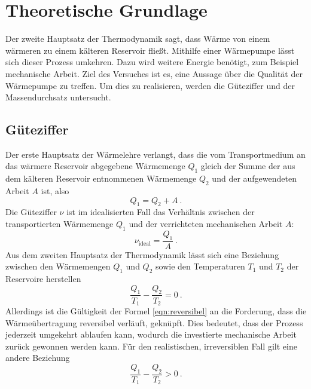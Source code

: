 \section{Theoretische Grundlage}
\label{sec:Theorie}

Der zweite Hauptsatz der Thermodynamik sagt, dass Wärme von einem wärmeren zu einem kälteren Reservoir fließt. Mithilfe einer Wärmepumpe lässt sich dieser Prozess umkehren. Dazu wird weitere Energie benötigt, zum Beispiel mechanische Arbeit. Ziel des Versuches ist es, eine Aussage über die Qualität der Wärmepumpe zu treffen. Um dies zu realisieren, werden die Güteziffer und der Massendurchsatz untersucht.

\subsection{Güteziffer}
Der erste Hauptsatz der Wärmelehre verlangt, dass die vom Transportmedium an das wärmere Reservoir abgegebene Wärmemenge $Q_\text{1}$ gleich der Summe der aus dem kälteren Reservoir entnommenen Wärmemenge $Q_\text{2}$ und der aufgewendeten Arbeit $A$ ist, also
\begin{equation}
	\label{eqn:Q1}
		Q_\text{1} = Q_\text{2} + A \ .
\end{equation}
Die Güteziffer $\nu$ ist im idealisierten Fall das Verhältnis zwischen der transportierten Wärmemenge $Q_\text{1}$ und der verrichteten mechanischen Arbeit $A$:
\begin{equation}
	\label{eqn:nu}
	\nu_\text{ideal} = \frac{Q_\text{1}}{A} \ .
\end{equation}
Aus dem zweiten Hauptsatz der Thermodynamik lässt sich eine Beziehung zwischen den Wärmemengen $Q_\text{1}$ und $Q_\text{2}$ sowie den Temperaturen $T_\text{1}$ und $T_\text{2}$ der Reservoire herstellen
\begin{equation}
	\label{eqn:reversibel}
	\frac{Q_\text{1}}{T_\text{1}} - \frac{Q_\text{2}}{T_\text{2}} = 0 \ .
\end{equation}
Allerdings ist die Gültigkeit der Formel \ref{eqn:reversibel} an die Forderung, dass die Wärmeübertragung reversibel verläuft, geknüpft. Dies bedeutet, dass der Prozess jederzeit umgekehrt ablaufen kann, wodurch die investierte mechanische Arbeit zurück gewonnen werden kann. Für den realistischen, irreversiblen Fall gilt eine andere Beziehung
\begin{equation}
	\label{eqn:irreversibel}
	\frac{Q_\text{1}}{T_\text{1}} - \frac{Q_\text{2}}{T_\text{2}} > 0 \ .
\end{equation}
